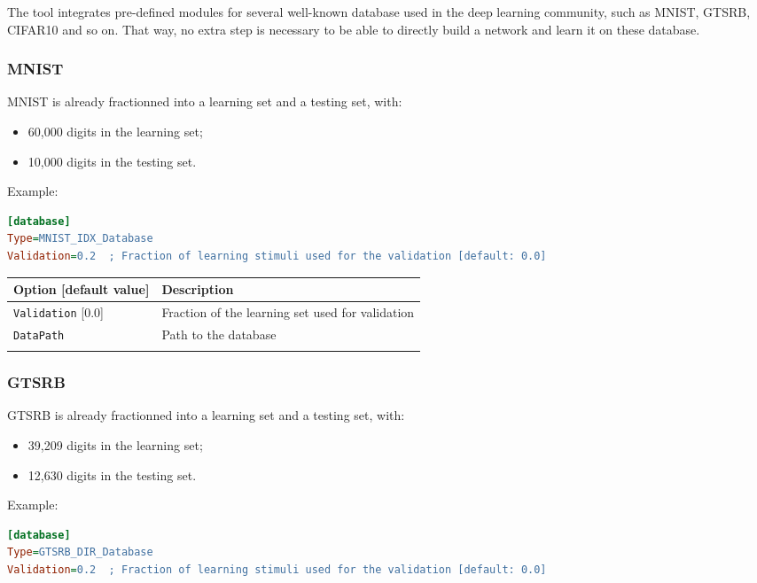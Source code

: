 \documentclass[a4paper,11pt,oneside]{article}
\newenvironment{myitemize}
{ \begin{itemize}
    \setlength{\itemsep}{0pt}
    \setlength{\parskip}{0pt}
    \setlength{\parsep}{0pt}     }
{ \end{itemize}                  }
\begin{document}
The tool integrates pre-defined modules for several well-known database used
in the deep learning community, such as MNIST, GTSRB, CIFAR10 and so on.
That way, no extra step is necessary to be able to directly build a network
and learn it on these database.

\subsubsection{MNIST}

MNIST \citep{LeCun1998} is already fractionned into a learning set and
a testing set, with:
\begin{myitemize}
\item 60,000 digits in the learning set;
\item 10,000 digits in the testing set.
\end{myitemize}

Example:
\begin{lstlisting}[language=ini]
[database]
Type=MNIST_IDX_Database
Validation=0.2  ; Fraction of learning stimuli used for the validation [default: 0.0]
\end{lstlisting}

\begin{center}
 \begin{tabular}{| p{5cm} | p{10cm} | }
 \hline
 Option [default value] & Description\\
 \hline\hline
  \lstinline!Validation! [0.0] & Fraction of the learning set used for
  validation \\
  \lstinline!DataPath! & Path to the database \\
   & \\
 \hline
\end{tabular}
\end{center}

\subsubsection{GTSRB}

GTSRB \citep{Stallkamp2012} is already fractionned into a learning set
and a testing set, with:
\begin{myitemize}
\item 39,209 digits in the learning set;
\item 12,630 digits in the testing set.
\end{myitemize}

Example:
\begin{lstlisting}[language=ini]
[database]
Type=GTSRB_DIR_Database
Validation=0.2  ; Fraction of learning stimuli used for the validation [default: 0.0]
\end{lstlisting}
\end{document}
